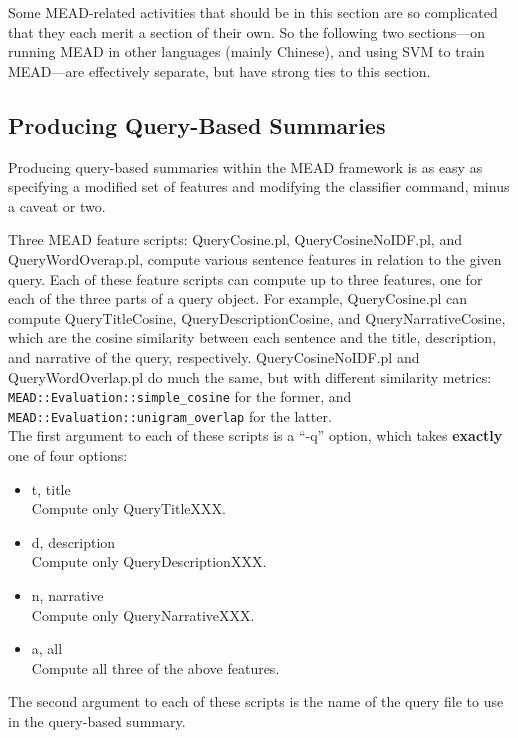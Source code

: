 \documentclass[10pt]{article}
\begin{document}
Some MEAD-related activities that should be in this section are 
so complicated that they each merit a section of their own.
So the following two sections---on running MEAD in other languages 
(mainly Chinese), and using SVM to train MEAD---are effectively
separate, but have strong ties to this section.

\subsection{Producing Query-Based Summaries}

Producing query-based summaries within the MEAD framework 
is as easy as specifying a modified set of features and
modifying the classifier command, minus a caveat or two.

Three MEAD feature scripts: QueryCosine.pl, QueryCosineNoIDF.pl,
and QueryWordOverap.pl, compute various sentence
features in relation to the given query.  Each of these
feature scripts can compute up to three features, one for
each of the three parts of a query object.  For example,
QueryCosine.pl can compute QueryTitleCosine,
QueryDescriptionCosine, and QueryNarrativeCosine,
which are the cosine similarity between each sentence
and the title, description, and narrative of the query,
respectively.  QueryCosineNoIDF.pl and QueryWordOverlap.pl
do much the same, but with different similarity metrics:
\verb|MEAD::Evaluation::simple_cosine| for the former, and
\verb|MEAD::Evaluation::unigram_overlap| for the latter.\\

The first argument to each of these scripts is a ``-q'' option, 
which takes {\bf exactly} one of four options: 

\begin{itemize}
\item t, title\\
Compute only QueryTitleXXX.
\item d, description\\
Compute only QueryDescriptionXXX.
\item n, narrative\\
Compute only QueryNarrativeXXX.
\item a, all\\
Compute all three of the above features.
\end{itemize}

The second argument to each of these scripts is the
name of the query file to use in the query-based summary.\\
\end{document}
